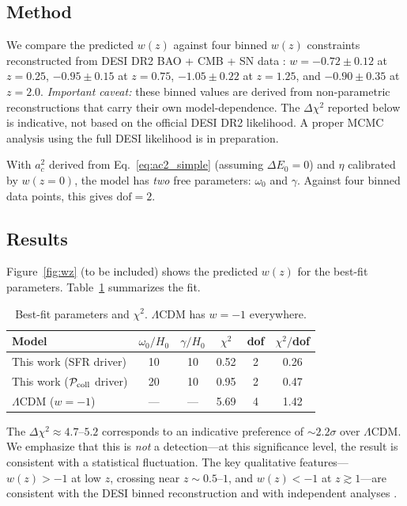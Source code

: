 \documentclass[aps,prd,twocolumn,superscriptaddress]{revtex4-2}
\begin{document}
\subsection{Method}

We compare the predicted $w(z)$ against four binned $w(z)$ constraints reconstructed from DESI DR2 BAO + CMB + SN data \cite{Li:2025,Pang:2025}: $w = -0.72 \pm 0.12$ at $z=0.25$, $-0.95 \pm 0.15$ at $z=0.75$, $-1.05 \pm 0.22$ at $z=1.25$, and $-0.90 \pm 0.35$ at $z=2.0$. \emph{Important caveat:} these binned values are derived from non-parametric reconstructions that carry their own model-dependence. The $\Delta\chi^2$ reported below is indicative, not based on the official DESI DR2 likelihood. A proper MCMC analysis using the full DESI likelihood is in preparation.

With $a_c^2$ derived from Eq.~\eqref{eq:ac2_simple} (assuming $\Delta E_0 = 0$) and $\eta$ calibrated by $w(z=0)$, the model has \emph{two} free parameters: $\omega_0$ and $\gamma$. Against four binned data points, this gives $\mathrm{dof} = 2$.

\subsection{Results}

Figure~\ref{fig:wz} (to be included) shows the predicted $w(z)$ for the best-fit parameters. Table~\ref{tab:results} summarizes the fit.

\begin{table}[h]
\centering
\caption{Best-fit parameters and $\chi^2$. $\Lambda$CDM has $w=-1$ everywhere.}
\label{tab:results}
\begin{tabular}{lccccc}
\toprule
Model & $\omega_0/H_0$ & $\gamma/H_0$ & $\chi^2$ & dof & $\chi^2/$dof \\
\midrule
This work (SFR driver)  & 10 & 10 & 0.52 & 2 & 0.26 \\
This work ($\mathcal{P}_{\rm coll}$ driver) & 20 & 10 & 0.95 & 2 & 0.47 \\
$\Lambda$CDM ($w=-1$)   & --- & --- & 5.69 & 4 & 1.42 \\
\bottomrule
\end{tabular}
\end{table}

The $\Delta\chi^2 \approx 4.7$--$5.2$ corresponds to an indicative preference of $\sim 2.2\sigma$ over $\Lambda$CDM. We emphasize that this is \emph{not} a detection---at this significance level, the result is consistent with a statistical fluctuation. The key qualitative features---$w(z) > -1$ at low $z$, crossing near $z \sim 0.5$--$1$, and $w(z) < -1$ at $z \gtrsim 1$---are consistent with the DESI binned reconstruction and with independent analyses \cite{Li:2025,Pang:2025}.
\end{document}
